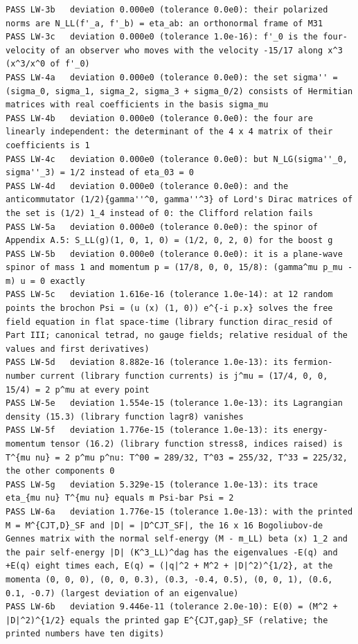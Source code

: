 \documentclass[
  10pt,
]{article}
\begin{document}
\begin{verbatim}
PASS LW-3b   deviation 0.000e0 (tolerance 0.0e0): their polarized norms are N_LL(f'_a, f'_b) = eta_ab: an orthonormal frame of M31
PASS LW-3c   deviation 0.000e0 (tolerance 1.0e-16): f'_0 is the four-velocity of an observer who moves with the velocity -15/17 along x^3 (x^3/x^0 of f'_0)
PASS LW-4a   deviation 0.000e0 (tolerance 0.0e0): the set sigma'' = (sigma_0, sigma_1, sigma_2, sigma_3 + sigma_0/2) consists of Hermitian matrices with real coefficients in the basis sigma_mu
PASS LW-4b   deviation 0.000e0 (tolerance 0.0e0): the four are linearly independent: the determinant of the 4 x 4 matrix of their coefficients is 1
PASS LW-4c   deviation 0.000e0 (tolerance 0.0e0): but N_LG(sigma''_0, sigma''_3) = 1/2 instead of eta_03 = 0
PASS LW-4d   deviation 0.000e0 (tolerance 0.0e0): and the anticommutator (1/2){gamma''^0, gamma''^3} of Lord's Dirac matrices of the set is (1/2) 1_4 instead of 0: the Clifford relation fails
PASS LW-5a   deviation 0.000e0 (tolerance 0.0e0): the spinor of Appendix A.5: S_LL(g)(1, 0, 1, 0) = (1/2, 0, 2, 0) for the boost g
PASS LW-5b   deviation 0.000e0 (tolerance 0.0e0): it is a plane-wave spinor of mass 1 and momentum p = (17/8, 0, 0, 15/8): (gamma^mu p_mu - m) u = 0 exactly
PASS LW-5c   deviation 1.616e-16 (tolerance 1.0e-14): at 12 random points the brochon Psi = (u (x) (1, 0)) e^{-i p.x} solves the free field equation in flat space-time (library function dirac_resid of Part III; canonical tetrad, no gauge fields; relative residual of the values and first derivatives)
PASS LW-5d   deviation 8.882e-16 (tolerance 1.0e-13): its fermion-number current (library function currents) is j^mu = (17/4, 0, 0, 15/4) = 2 p^mu at every point
PASS LW-5e   deviation 1.554e-15 (tolerance 1.0e-13): its Lagrangian density (15.3) (library function lagr8) vanishes
PASS LW-5f   deviation 1.776e-15 (tolerance 1.0e-13): its energy-momentum tensor (16.2) (library function stress8, indices raised) is T^{mu nu} = 2 p^mu p^nu: T^00 = 289/32, T^03 = 255/32, T^33 = 225/32, the other components 0
PASS LW-5g   deviation 5.329e-15 (tolerance 1.0e-13): its trace eta_{mu nu} T^{mu nu} equals m Psi-bar Psi = 2
PASS LW-6a   deviation 1.776e-15 (tolerance 1.0e-13): with the printed M = M^{CJT,D}_SF and |D| = |D^CJT_SF|, the 16 x 16 Bogoliubov-de Gennes matrix with the normal self-energy (M - m_LL) beta (x) 1_2 and the pair self-energy |D| (K^3_LL)^dag has the eigenvalues -E(q) and +E(q) eight times each, E(q) = (|q|^2 + M^2 + |D|^2)^{1/2}, at the momenta (0, 0, 0), (0, 0, 0.3), (0.3, -0.4, 0.5), (0, 0, 1), (0.6, 0.1, -0.7) (largest deviation of an eigenvalue)
PASS LW-6b   deviation 9.446e-11 (tolerance 2.0e-10): E(0) = (M^2 + |D|^2)^{1/2} equals the printed gap E^{CJT,gap}_SF (relative; the printed numbers have ten digits)

\end{verbatim}
\end{document}
